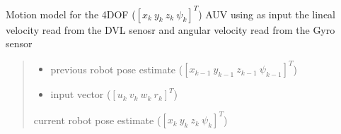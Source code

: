 \documentclass[letterpaper,10pt,english]{sphinxmanual}
\begin{document}
\begin{fulllineitems}
\begin{fulllineitems}
\label{\detokenize{DRLocalization:DR_4DOFAUV_DVLGyro.DR_4DOFAUV_DVLGyro.Localize}}
\pysigstartsignatures
{}
\pysigstopsignatures
\sphinxAtStartPar
Motion model for the 4DOF (\([x_{k}~y_{k}~z_{k}~\psi_{k}]^T\)) AUV using as input the lineal velocity read from the DVL senosr and angular velocity read from the Gyro sensor
\begin{quote}\begin{description}
\begin{itemize}
\item {} 
\sphinxAtStartPar
{} \textendash{} previous robot pose estimate (\([x_{k-1}~y_{k-1}~z_{k-1}~\psi_{k-1}]^T\))

\item {} 
\sphinxAtStartPar
{} \textendash{} input vector (\([u_{k}~v_{k}~w_{k}~r_{k}]^T\))

\end{itemize}

\sphinxAtStartPar
current robot pose estimate (\([x_{k}~y_{k}~z_{k}~\psi_{k}]^T\))

\end{description}\end{quote}

\end{fulllineitems}



\end{fulllineitems}
\end{document}
